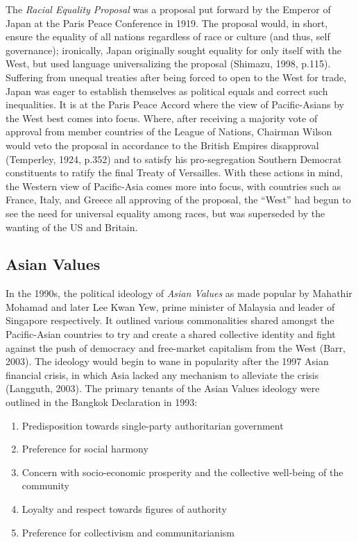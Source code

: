 \documentclass[man,donotrepeattitle,letter]{apa6}
\begin{document}
The \textit{Racial Equality Proposal} was a proposal put forward by the Emperor of Japan at the Paris Peace Conference in 1919.  The proposal would, in short, ensure the equality of all nations regardless of race or culture (and thus, self governance); ironically, Japan originally sought equality for only itself with the West, but used language universalizing the proposal (Shimazu, 1998, p.115).  Suffering from unequal treaties after being forced to open to the West for trade, Japan was eager to establish themselves as political equals and correct such inequalities. It is at the Paris Peace Accord where the view of Pacific-Asians by the West best comes into focus.  Where, after receiving a majority vote of approval from member countries of the League of Nations, Chairman Wilson would veto the proposal in accordance to the British Empires disapproval (Temperley, 1924, p.352) and to satisfy his pro-segregation Southern Democrat constituents to ratify the final Treaty of Versailles.  With these actions in mind, the Western view of Pacific-Asia comes more into focus, with countries such as France, Italy, and Greece all approving of the proposal, the ``West'' had begun to see the need for universal equality among races, but was superseded by the wanting of the US and Britain.

\subsection{Asian Values}
In the 1990s, the political ideology of \textit{Asian Values} as made popular by Mahathir Mohamad and later Lee Kwan Yew, prime minister of Malaysia and leader of Singapore respectively. It outlined various commonalities shared amongst the Pacific-Asian countries to try and create a shared collective identity and fight against the push of democracy and free-market capitalism from the West (Barr, 2003).  The ideology would begin to wane in popularity after the 1997 Asian financial crisis, in which Asia lacked any mechanism to alleviate the crisis (Langguth, 2003).  The primary tenants of the Asian Values ideology were outlined in the Bangkok Declaration in 1993:

\begin{enumerate}
  \item Predisposition towards single-party authoritarian government
  \item Preference for social harmony
  \item Concern with socio-economic prosperity and the collective well-being of the community
  \item Loyalty and respect towards figures of authority
  \item Preference for collectivism and communitarianism
\end{enumerate}
\end{document}
